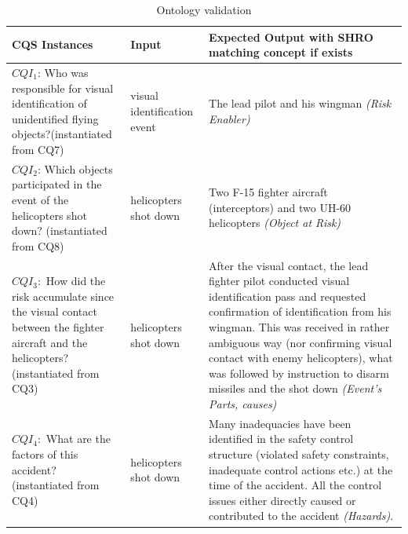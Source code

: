 \documentclass[sw]{iosart2x}
\begin{document}
\begin{table}\label{tab:my2}\caption{Ontology validation}
\begin{tabular}{|p{6cm}|l|p{6.5cm}|} 
\hline
CQS Instances& \textbf{Input} & \textbf{Expected Output with SHRO matching concept if exists} \\
\hline
$CQI_1$: Who was responsible for visual identification of unidentified flying objects?(instantiated from CQ7)  &visual identification event & The lead pilot and his wingman \emph{(Risk Enabler)} \\
$CQI_2$:  Which objects participated in the event of the helicopters shot down? (instantiated from CQ8) &  helicopters shot down & Two F-15 fighter aircraft (interceptors) and two UH-60 helicopters \emph{(Object at Risk)} \\
$CQI_3:$  How did the risk accumulate since the visual contact between the fighter aircraft and the helicopters? (instantiated from CQ3) & helicopters shot down &  After the visual contact, the lead fighter pilot conducted visual identification pass and requested confirmation of identification from his wingman. This was received in rather ambiguous way (nor confirming visual contact with enemy helicopters), what was followed by instruction to disarm missiles and the shot down \emph{(Event's Parts, causes)}  \\ 
$CQI_4:$ What are the factors of this accident? (instantiated from CQ4)& helicopters shot down & Many inadequacies have been identified in the safety control structure (violated safety constraints, inadequate control actions etc.) at the time of the accident. All the control issues either directly caused or contributed to the accident \emph{(Hazards)}.  \\
\hline
\end{tabular}
\end{table}


\end{document}
